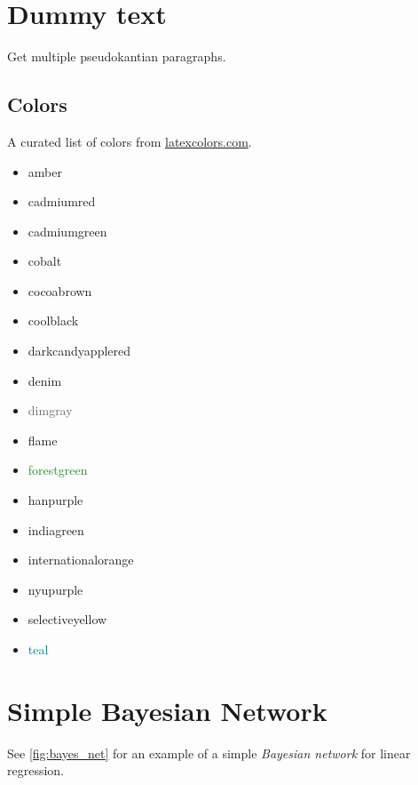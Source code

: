 \documentclass{article}
\begin{document}
\section{Dummy text}

Get multiple pseudokantian paragraphs.

\kant[1-2]

\subsection{Colors}

A curated list of colors from \url{latexcolors.com}.

\begin{itemize}
	\item \textcolor{amber}{amber}
	\item \textcolor{cadmiumred}{cadmiumred}
	\item \textcolor{cadmiumgreen}{cadmiumgreen}
	\item \textcolor{cobalt}{cobalt}
	\item \textcolor{cocoabrown}{cocoabrown}
	\item \textcolor{coolblack}{coolblack}
	\item \textcolor{darkcandyapplered}{darkcandyapplered}
	\item \textcolor{denim}{denim}
	\item \textcolor{dimgray}{dimgray}
	\item \textcolor{flame}{flame}
	\item \textcolor{forestgreen}{forestgreen}
	\item \textcolor{hanpurple}{hanpurple}
	\item \textcolor{indiagreen}{indiagreen}
	\item \textcolor{internationalorange}{internationalorange}
	\item \textcolor{nyupurple}{nyupurple}
	\item \textcolor{selectiveyellow}{selectiveyellow}
	\item \textcolor{teal}{teal}
\end{itemize}

\section{Simple Bayesian Network}

See \cref{fig:bayes_net} for an example of a simple \emph{Bayesian network} for linear regression.
\end{document}
